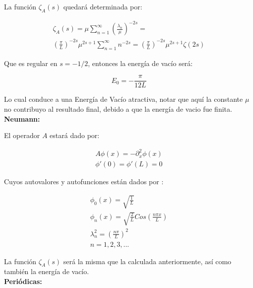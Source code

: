 La función $\zeta _A (s)$ quedará determinada por:

\begin{equation}
\begin{array}{c}
\zeta _A (s) = \mu
\sum _{n=1} ^{\infty} \left( \frac{\lambda _n}{\mu} \right) ^{-2s} =  \\
\left(  \frac{\pi}{L} \right) ^{-2s} \mu ^{2s+1} \sum _{n=1} ^{\infty} n ^{-2s} = 
\left( \frac{\pi}{L} \right) ^{-2s} \mu ^{2s+1} \zeta (2s)
\end{array}
\end{equation}

Que es regular en $s=-1/2$, entonces la energía de vacío será:

\begin{equation}
E _0 = - \frac{\pi}{12 L}
\end{equation}

Lo cual conduce a una Energía de Vacío atractiva, notar que aquí la constante $\mu$ no contribuyo al resultado final, debido a que la energía de vacio fue finita.\\

\textbf{Neumann:}

El operador $A$ estará dado por:

\begin{equation}
\begin{array}{c}
	A \phi (x) = - \partial _x ^2 \phi (x) \\
    \phi ' (0) = \phi ' (L) = 0 
\end{array}
\end{equation}



Cuyos autovalores y autofunciones están dados por  : 

\begin{equation}
\begin{array}{c}
	\phi _0 (x) = \sqrt{ \frac{1}{L} } \\
	\phi _n (x)  = \sqrt{\frac{2}{L}} Cos( \frac{n \pi x}{L} ) \\
	\lambda _n ^2 = \left( \frac{n \pi }{L} \right) ^2 \\
	n = 1,2,3, ...
\end{array}
\end{equation}

La función $\zeta _A (s)$ será la misma que la calculada anteriormente, así como también la energía de vacío. \\

\textbf{Periódicas:}

